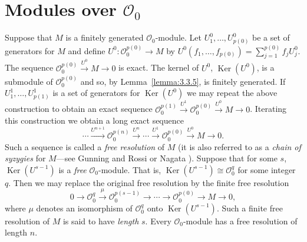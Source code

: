 \section{\texorpdfstring{Modules over $\mathcal O_0$}{Modules over O0}}\label{sec:3:6}
Suppose that $M$ is a finitely generated $\mathcal O_0$-module. Let $U_1^0,\ldots,U_{p(0)}^0$ be a set of generators for $M$ and define $U^0:\mathcal O_0^{p(0)}\to M$ by $U^0(f_1,\ldots,f_{p(0)})=\sum_{j=1}^{p(0)}f_jU_j^0$. The sequence $\mathcal O_0^{p(0)}\xrightarrow{U^0}M\to0$ is exact. The kernel of $U^0$, $\operatorname{Ker}(U^0)$, is a submodule of $\mathcal O_0^{p(0)}$ and so, by Lemma~\ref{lemma:3.3.5}, is finitely generated. If $U_1^1,\ldots,U_{p(1)}^1$ is a set of generators for $\operatorname{Ker}(U^0)$ we may repeat the above construction to obtain an exact sequence $\mathcal O_0^{p(1)}\xrightarrow{U^1}\mathcal O_0^{p(0)}\xrightarrow{U^0}M\to0$. Iterating this construction we obtain a long exact sequence
\[\cdots\xrightarrow{U^{n+1}}\mathcal O_0^{p(n)}\xrightarrow{U^n}\cdots\xrightarrow{U^1}\mathcal O_0^{p(0)}\xrightarrow{U^0}M\to0.\]
Such a sequence is called a \emph{free resolution} of $M$ (it is also referred to as a \emph{chain of syzygies} for $M$---see Gunning and Rossi \cite{bib:I:gunning-r-c-and-rossi-h:1} or Nagata \cite{bib:I:nagata-m:1}). Suppose that for some $s$, $\operatorname{Ker}(U^{s-1})$ is a \emph{free} $\mathcal O_0$-module. That is, $\operatorname{Ker}(U^{s-1})\cong\mathcal O_0^q$ for some integer $q$. Then we may replace the original free resolution by the finite free resolution
\[0\to\mathcal O_0^q\xrightarrow{\mu}\mathcal O_0^{p(s-1)}\longrightarrow\cdots\to\mathcal O_0^{p(0)}\to M\to0,\]
where $\mu$ denotes an isomorphism of $\mathcal O_0^q$ onto $\operatorname{Ker}(U^{s-1})$. Such a finite free resolution of $M$ is said to have \emph{length} $s$.
 Every $\mathcal O_0$-module has a free resolution of length $n$.
